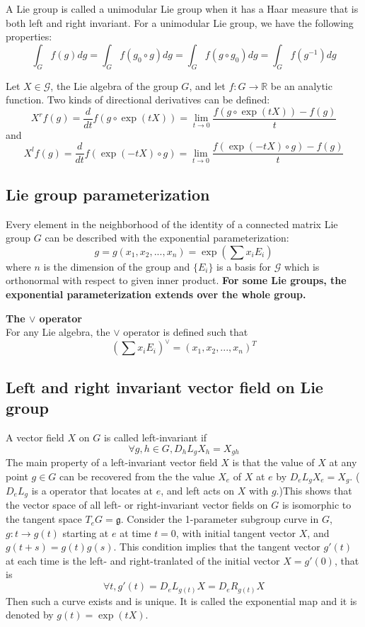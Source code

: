 \begin{refsection}
\begin{definition}
A Lie group is called a unimodular Lie group when it has a Haar measure that is both left and right invariant. For a unimodular Lie group, we have the following properties:
$$\int_G f(g)dg =  \int_G f(g_0 \circ g) dg = \int_G f(g\circ g_0)dg = \int_G f(g^{-1}) dg$$
\end{definition}



\begin{definition}
Let $X \in \mathcal{G}$, the Lie algebra of the group $G$, and let $f: G \rightarrow \mathbb{R}$ be an analytic function. Two kinds of directional derivatives can be defined:$$X^rf(g) = \frac{d}{dt}f(g\circ \exp(tX)) = \lim_{t\rightarrow 0}\frac{f(g\circ \exp(tX)) - f(g)}{t}$$ and $$X^lf(g) = \frac{d}{dt}f(\exp(-tX) \circ g) = \lim_{t\rightarrow 0}\frac{f(\exp(-tX) \circ g) - f(g)}{t}$$
\end{definition}


\subsection{Lie group parameterization}
Every element in the neighborhood of the identity of a connected matrix Lie group $G$ can be described with the exponential parameterization:
$$g=g(x_1,x_2,...,x_n) = \exp(\sum x_iE_i)$$
where $n$ is the dimension of the group and $\{E_i\}$ is a basis for $\mathcal{G}$ which is orthonormal with respect to given inner product. \textbf{For some Lie groups, the exponential parameterization extends over the whole group.}

\begin{mdframed}
\textbf{The $\vee$ operator}\\
For any Lie algebra, the $\vee$ operator is defined such that 
$$(\sum x_i E_i)^{\vee} = (x_1,x_2,...,x_n)^T$$
\end{mdframed}



\subsection{Left and right invariant vector field on Lie group }
A vector field $X$ on $G$ is called left-invariant if
$$\forall g, h \in G, D_hL_g X_h = X_{gh}$$
The main property of a left-invariant vector field $X$ is that the value of $X$ at any point $g\in G$ can be recovered from the the value $X_e$ of $X$ at $e$ by $D_eL_gX_e = X_g$. ($D_eL_g$ is a operator that locates at $e$, and left acts on $X$ with $g$.)This shows that the vector space of all left- or right-invariant vector fields on $G$ is isomorphic to the tangent space $T_eG = \mathfrak{g}$.
Consider the 1-parameter subgroup curve in $G$, $g:t\rightarrow g(t)$ starting at $e$ at time $t=0$, with initial tangent vector $X$, and $g(t+s) = g(t)g(s)$. 
This condition implies that the tangent vector $g'(t)$ at each time is the left- and right-tranlated of the initial vector $X = g'(0)$, that is
$$\forall t, g'(t) = D_eL_{g(t)}X = D_eR_{g(t)}X$$
Then such a curve exists and is unique. It is called the exponential map and it is denoted by $g(t)=\exp(tX)$.


\end{refsection}
